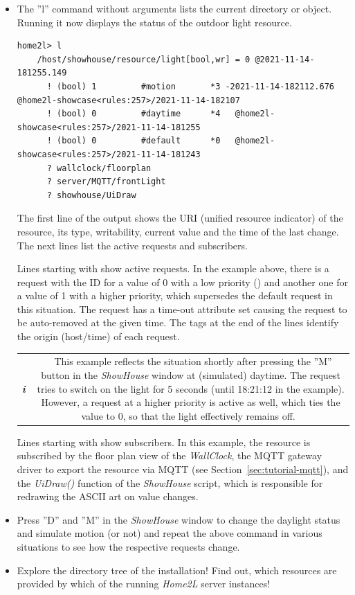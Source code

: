 \documentclass[12pt,english,parskip=half,headheight=19pt]{scrreprt}
\newcommand{\lst}[1]{\colorbox{lstbackground}{\footnotesize\code{#1}}}
\newcommand{\infobox}[1]{
  \par
  \medskip
  \hfill
  \setlength\arrayrulewidth{1pt}
  \begin{tabular}[t]{c|c|}
    \parbox{1.8em}{\hfill\textit{\Huge\textbf{i}\,}}
    &
    \,\parbox{0.89\linewidth}{\setlength{\parskip}{0.5em} \small #1}\,
  \end{tabular}
  \medskip
  \par
}
\begin{document}
\begin{itemize}[$\blacktriangleright$]
\item
  The ''l'' command without arguments lists the current directory or object.
  Running it now displays the status of the outdoor light resource.
  \begin{lstlisting}[language=home2l]
    home2l> l
    /host/showhouse/resource/light[bool,wr] = 0 @2021-11-14-181255.149
      ! (bool) 1         #motion       *3 -2021-11-14-182112.676   @home2l-showcase<rules:257>/2021-11-14-182107
      ! (bool) 0         #daytime      *4   @home2l-showcase<rules:257>/2021-11-14-181255
      ! (bool) 0         #default      *0   @home2l-showcase<rules:257>/2021-11-14-181243
      ? wallclock/floorplan
      ? server/MQTT/frontLight
      ? showhouse/UiDraw
  \end{lstlisting}

  The first line of the output shows the URI (unified resource indicator)
  of the resource, its type, writability, current value and the time of
  the last change. The next lines list the active requests and
  subscribers.

  Lines starting with \lst{!} show active requests. In the example
  above, there is a request with the ID \lst{#default} for a value of 0
  with a low priority (\lst{*0}) and another one \lst{#motion} for a value of 1
  with a higher priority, which supersedes the default request in this
  situation. The \lst{#motion} request has a time-out attribute set causing
  the request to be auto-removed at the given time. The \lst{@} tags at the
  end of the lines identify the origin (host/time) of each request.

  \infobox{
    This example reflects the situation shortly after pressing the ''M''
    button in the \textit{ShowHouse} window at (simulated) daytime.
    The \lst{#motion} request tries to switch on the light for 5 seconds
    (until 18:21:12 in the example). However, a \lst{#daylight} request at a higher
    priority is active as well, which ties the value to 0, so that the
    light effectively remains off.
  }

  Lines starting with \lst{?} show subscribers. In this example, the resource is subscribed by
  the floor plan view of the \textit{WallClock}, the MQTT gateway driver to export the
  resource via MQTT (see Section~\ref{sec:tutorial-mqtt}), and the \textit{UiDraw()} function of
  the \textit{ShowHouse} script, which is responsible for redrawing the ASCII art on value changes.

\item
  Press ''D'' and ''M'' in the \textit{ShowHouse} window to change the daylight
  status and simulate motion (or not) and repeat the above command in
  various situations to see how the respective requests change.

\item
  Explore the directory tree of the installation! Find out, which resources are
  provided by which of the running \textit{Home2L} server instances!

\end{itemize}
\end{document}
